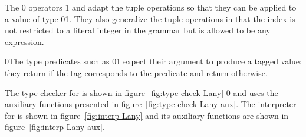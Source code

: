 \documentclass[7x10]{TimesAPriori_MIT}%
\def\racketEd{0}
\def\pythonEd{1}
\def\edition{1}
\newcommand{\racket}[1]{{\if\edition\racketEd{#1}\fi}}
\newcommand{\pythonColor}[0]{}
\newcommand{\python}[1]{{\if\edition\pythonEd\pythonColor #1\fi}}
\numberwithin{theorem}{chapter}
\numberwithin{definition}{chapter}
\numberwithin{equation}{chapter}
\begin{document}
The \racket{} operators
\python{ and } adapt the tuple
operations so that they can be applied to a value of type
\racket{}\python{}.  They also generalize the
tuple operations in that the index is not restricted to a literal
integer in the grammar but is allowed to be any expression.

\racket{The type predicates such as
\racket{}\python{\key{is\_bool}} expect their argument
to produce a tagged value; they return  {\TRUE} if the tag corresponds to
the predicate and return {\FALSE} otherwise.}

The type checker for \LangAny{} is shown in
figure~\ref{fig:type-check-Lany}
%
\racket{ and uses the auxiliary functions presented in
figure~\ref{fig:type-check-Lany-aux}}.
%
The interpreter for \LangAny{} is shown in figure~\ref{fig:interp-Lany} and
its auxiliary functions are shown in figure~\ref{fig:interp-Lany-aux}.
\end{document}
